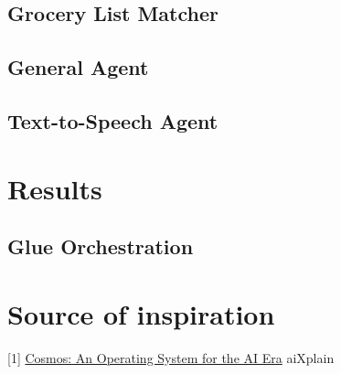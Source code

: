 \documentclass{article}
\begin{document}
\subsection*{\color{draculayellow}Grocery List Matcher}

\subsection*{\color{draculayellow}General Agent}

\subsection*{\color{draculayellow}Text-to-Speech Agent}

\section*{\color{draculagreen}Results}

\subsection*{\color{draculagreen}Glue Orchestration}

\section*{\color{draculagreen}Source of inspiration}

[1] \href{https://humane.com/media/cosmos-an-operating-system-for-the-ai-era}{Cosmos: An Operating System for the AI Era} \newline
[2] aiXplain
\end{document}
